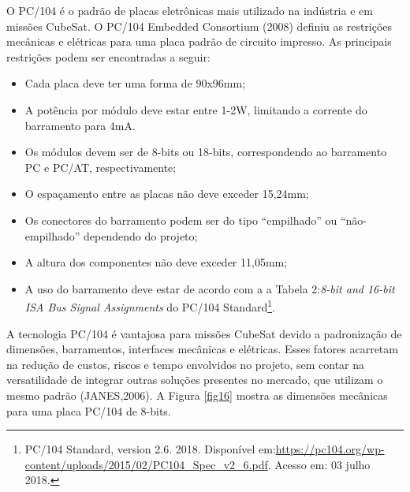 O PC/104 é o padrão de placas eletrônicas mais utilizado na indústria e em missões CubeSat. O PC/104 Embedded Consortium (2008) definiu as restrições mecânicas e elétricas para uma placa padrão de circuito impresso. As principais restrições podem ser encontradas a seguir:

\begin{itemize}
\item Cada placa deve ter uma forma de 90x96mm;
\item A potência por módulo deve estar entre 1-2W, limitando a corrente do barramento para 4mA.
\item Os módulos devem ser de 8-bits ou 18-bits, correspondendo ao barramento PC e PC/AT, respectivamente;
\item O espaçamento entre as placas não deve exceder 15,24mm;
\item Os conectores do barramento podem ser do tipo “empilhado” ou “não-empilhado” dependendo do projeto;
\item A altura dos componentes não deve exceder 11,05mm;
\item A uso do barramento deve estar de acordo com a a Tabela 2:\textit{8-bit and 16-bit ISA Bus Signal Assignments} do PC/104 Standard\footnote{PC/104 Standard, version 2.6. 2018. Disponível em:\url{https://pc104.org/wp-content/uploads/2015/02/PC104_Spec_v2_6.pdf}. Acesso em: 03 julho 2018.}.

\end{itemize}

A tecnologia PC/104 é vantajosa para missões CubeSat devido a padronização de dimensões, barramentos, interfaces mecânicas e elétricas. Esses fatores acarretam na redução de custos, riscos e tempo envolvidos no projeto, sem contar na versatilidade de integrar outras soluções presentes no mercado, que utilizam o mesmo padrão (JANES,2006). A Figura \ref{fig16} mostra as dimensões mecânicas para uma placa PC/104 de 8-bits. 

